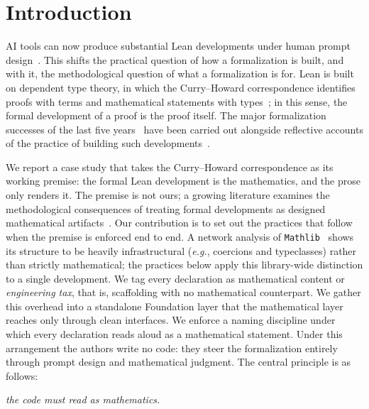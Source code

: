 
\section{Introduction}\label{sec:intro}

AI tools can now produce substantial Lean developments under human prompt
design~\cite{ilin2026semiautonomousvml, avigad2026mathematiciansageai}. This
shifts the practical question of how a formalization is built, and with it, the
methodological question of what a formalization is for. Lean is built on
dependent type theory, in which the Curry--Howard correspondence identifies
proofs with terms and mathematical statements with
types~\cite{deMoura2021Lean4}; in this sense, the formal development of a proof
is the proof itself. The major formalization successes of the last five
years~\cite{lean_liquid, vandoorn2023sphereeversion,
Anderson_Formalization_of_the_2023, becker2025carleson_blueprint,
bolan2025equationaltheoriesprojectadvancing, flt_lean} have been carried out
alongside reflective accounts of the practice of building such
developments~\cite{Avigad2023MathematicsAT, avigad2026mathematiciansageai}.

We report a case study that takes the Curry--Howard correspondence as its
working premise: the formal Lean development is the mathematics, and the prose
only renders it. The premise is not ours; a growing literature examines the
methodological consequences of treating formal developments as designed
mathematical artifacts~\cite{commelin2023abstractionboundariesspecdriven,
baanen2025growing, vandoorn2020maintaining, avigad2024anatomyformalproof,
ilin2026semiautonomousvml}. Our contribution is to set out the practices that
follow when the premise is enforced end to end. A network analysis of
\texttt{Mathlib}~\cite{li2026networkstructuremathlib} shows its structure to be
heavily infrastructural (\emph{e.g.}, coercions and typeclasses) rather than
strictly mathematical; the practices below apply this library-wide distinction
to a single development. We tag every declaration as mathematical content or
\emph{engineering tax}, that is, scaffolding with no mathematical counterpart.
We gather this overhead into a standalone Foundation layer that the
mathematical layer reaches only through clean interfaces. We enforce a naming
discipline under which every declaration reads aloud as a mathematical
statement. Under this arrangement the authors write no code: they steer the
formalization entirely through prompt design and mathematical judgment. The
central principle is as follows:
\begin{center}
\emph{the code must read as mathematics.}
\end{center}


